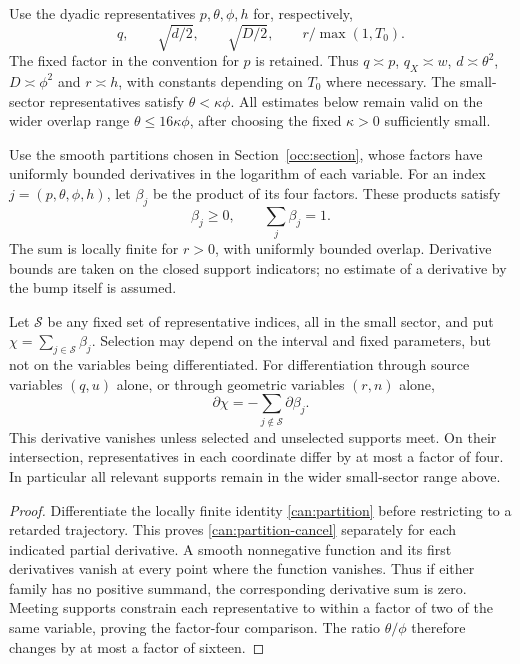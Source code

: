 Use the dyadic representatives $p,\theta,\phi,h$ for, respectively,
\[
 q,\qquad \sqrt{d/2},\qquad \sqrt{D/2},\qquad r/\max(1,T_0).
\]
The fixed factor in the convention for $p$ is retained. Thus
$q\asymp p$, $q_X\asymp w$, $d\asymp\theta^2$,
$D\asymp\phi^2$ and $r\asymp h$, with constants depending on $T_0$
where necessary. The small-sector representatives satisfy
$\theta<\kappa\phi$. All estimates below remain valid on the wider
overlap range $\theta\leq16\kappa\phi$, after choosing the fixed
$\kappa>0$ sufficiently small.

Use the smooth partitions chosen in Section~\ref{occ:section}, whose
factors have uniformly bounded derivatives in the logarithm of each
variable. For an index $j=(p,\theta,\phi,h)$, let $\beta_j$ be the
product of its four factors. These products satisfy
\begin{equation}\label{can:partition}
 \beta_j\geq0,\qquad \sum_j\beta_j=1.
\end{equation}
The sum is locally finite for $r>0$, with uniformly bounded overlap.
Derivative bounds are taken on the closed support indicators; no estimate
of a derivative by the bump itself is assumed.

\begin{lemma}\label{can:cutoff-cancellation}
Let $\mathcal S$ be any fixed set of representative indices, all in the
small sector, and put $\chi=\sum_{j\in\mathcal S}\beta_j$. Selection
may depend on the interval and fixed parameters, but not on the variables
being differentiated. For differentiation through source variables
$(q,u)$ alone, or through geometric variables $(r,n)$ alone,
\begin{equation}\label{can:partition-cancel}
 \partial\chi=-\sum_{j\notin\mathcal S}\partial\beta_j.
\end{equation}
This derivative vanishes unless selected and unselected supports meet.
On their intersection, representatives in each coordinate differ by at
most a factor of four. In particular all relevant supports remain in
the wider small-sector range above.
\end{lemma}

\begin{proof}
Differentiate the locally finite identity \eqref{can:partition} before
restricting to a retarded trajectory. This proves
\eqref{can:partition-cancel} separately for each indicated partial
derivative. A smooth nonnegative function and its first derivatives vanish
at every point where the function vanishes. Thus if either family has no
positive summand, the corresponding derivative sum is zero. Meeting
supports constrain each representative to within a factor of two of the
same variable, proving the factor-four comparison. The ratio $\theta/\phi$
therefore changes by at most a factor of sixteen.
\end{proof}

